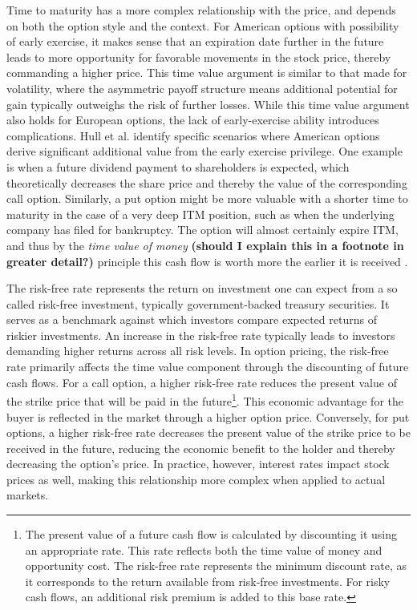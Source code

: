\documentclass[english,12pt,a4paper,pdftex,sci,utf8]{aaltothesis}
\begin{document}
Time to maturity has a more complex relationship with the price, and depends on both the option style and the context. For American options with possibility of early exercise, it makes sense that an expiration date further in the future leads to more opportunity for favorable movements in the stock price, thereby commanding a higher price. This time value argument is similar to that made for volatility, where the asymmetric payoff structure means additional potential for gain typically outweighs the risk of further losses. While this time value argument also holds for European options, the lack of early-exercise ability introduces complications. Hull et al. \cite{hull2013fundamentals} identify specific scenarios where American options derive significant additional value from the early exercise privilege. One example is when a future dividend payment to shareholders is expected, which theoretically decreases the share price and thereby the value of the corresponding call option. Similarly, a put option might be more valuable with a shorter time to maturity in the case of a very deep ITM position, such as when the underlying company has filed for bankruptcy. The option will almost certainly expire ITM, and thus by the \emph{time value of money} \textbf{(should I explain this in a footnote in greater detail?)} principle this cash flow is worth more the earlier it is received \cite{berk2007corporate}.

The risk-free rate represents the return on investment one can expect from a so called risk-free investment, typically government-backed treasury securities. It serves as a benchmark against which investors compare expected returns of riskier investments. An increase in the risk-free rate typically leads to investors demanding higher returns across all risk levels. In option pricing, the risk-free rate primarily affects the time value component through the discounting of future cash flows. For a call option, a higher risk-free rate reduces the present value of the strike price that will be paid in the future\footnote{The present value of a future cash flow is calculated by discounting it using an appropriate rate. This rate reflects both the time value of money and opportunity cost. The risk-free rate represents the minimum discount rate, as it corresponds to the return available from risk-free investments. For risky cash flows, an additional risk premium is added to this base rate.}. This economic advantage for the buyer is reflected in the market through a higher option price. Conversely, for put options, a higher risk-free rate decreases the present value of the strike price to be received in the future, reducing the economic benefit to the holder and thereby decreasing the option's price. In practice, however, interest rates impact stock prices as well, making this relationship more complex when applied to actual markets.
\end{document}
